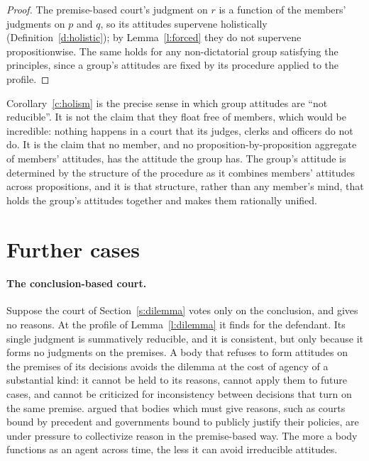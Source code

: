 \documentclass{situationist-preprint}
\begin{document}
\begin{proof}
The premise-based court's judgment on $r$ is a function of the members' judgments on $p$ and $q$, so its attitudes supervene holistically (Definition~\ref{d:holistic}); by Lemma~\ref{l:forced} they do not supervene propositionwise. The same holds for any non-dictatorial group satisfying the principles, since a group's attitudes are fixed by its procedure applied to the profile.
\end{proof}

Corollary~\ref{c:holism} is the precise sense in which group attitudes are \enquote{not reducible}. It is not the claim that they float free of members, which would be incredible: nothing happens in a court that its judges, clerks and officers do not do. It is the claim that no member, and no proposition-by-proposition aggregate of members' attitudes, has the attitude the group has. The group's attitude is determined by the structure of the procedure as it combines members' attitudes across propositions, and it is that structure, rather than any member's mind, that holds the group's attitudes together and makes them rationally unified.

\section{Further cases}\label{s:cases}

\paragraph{The conclusion-based court.} Suppose the court of Section~\ref{s:dilemma} votes only on the conclusion, and gives no reasons. At the profile of Lemma~\ref{l:dilemma} it finds for the defendant. Its single judgment is summatively reducible, and it is consistent, but only because it forms no judgments on the premises. A body that refuses to form attitudes on the premises of its decisions avoids the dilemma at the cost of agency of a substantial kind: it cannot be held to its reasons, cannot apply them to future cases, and cannot be criticized for inconsistency between decisions that turn on the same premise. \citet{Pettit2001} argued that bodies which must give reasons, such as courts bound by precedent and governments bound to publicly justify their policies, are under pressure to collectivize reason in the premise-based way. The more a body functions as an agent across time, the less it can avoid irreducible attitudes.
\end{document}
